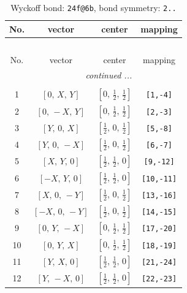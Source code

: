 \documentclass[fleqn,8pt]{jsarticle}
\begin{document}
\renewcommand{\arraystretch}{1.2}
\begin{longtable}{cccc}
\caption{Wyckoff bond: {\tt 24f@6b}, bond symmetry: {\tt 2..}}
 \\
 \hline \hline
No. & vector & center & mapping \\ \hline \endfirsthead

\multicolumn{3}{l}{\tablename\ \thetable{}} \\
 \hline \hline
No. & vector & center & mapping \\ \hline \endhead

 \hline \hline
\multicolumn{3}{r}{\footnotesize\it continued ...} \\ \endfoot

 \hline \hline
\multicolumn{3}{r}{} \\ \endlastfoot

1 & $\left[ 0,\, X,\, Y \right]$ & $\left[ 0,\, \frac{1}{2},\, \frac{1}{2} \right]$ & {\tt [1,-4]} \\ \hline
2 & $\left[ 0,\, - X,\, Y \right]$ & $\left[ 0,\, \frac{1}{2},\, \frac{1}{2} \right]$ & {\tt [2,-3]} \\ \hline
3 & $\left[ Y,\, 0,\, X \right]$ & $\left[ \frac{1}{2},\, 0,\, \frac{1}{2} \right]$ & {\tt [5,-8]} \\ \hline
4 & $\left[ Y,\, 0,\, - X \right]$ & $\left[ \frac{1}{2},\, 0,\, \frac{1}{2} \right]$ & {\tt [6,-7]} \\ \hline
5 & $\left[ X,\, Y,\, 0 \right]$ & $\left[ \frac{1}{2},\, \frac{1}{2},\, 0 \right]$ & {\tt [9,-12]} \\ \hline
6 & $\left[ - X,\, Y,\, 0 \right]$ & $\left[ \frac{1}{2},\, \frac{1}{2},\, 0 \right]$ & {\tt [10,-11]} \\ \hline
7 & $\left[ X,\, 0,\, - Y \right]$ & $\left[ \frac{1}{2},\, 0,\, \frac{1}{2} \right]$ & {\tt [13,-16]} \\ \hline
8 & $\left[ - X,\, 0,\, - Y \right]$ & $\left[ \frac{1}{2},\, 0,\, \frac{1}{2} \right]$ & {\tt [14,-15]} \\ \hline
9 & $\left[ 0,\, Y,\, - X \right]$ & $\left[ 0,\, \frac{1}{2},\, \frac{1}{2} \right]$ & {\tt [17,-20]} \\ \hline
10 & $\left[ 0,\, Y,\, X \right]$ & $\left[ 0,\, \frac{1}{2},\, \frac{1}{2} \right]$ & {\tt [18,-19]} \\ \hline
11 & $\left[ Y,\, X,\, 0 \right]$ & $\left[ \frac{1}{2},\, \frac{1}{2},\, 0 \right]$ & {\tt [21,-24]} \\ \hline
12 & $\left[ Y,\, - X,\, 0 \right]$ & $\left[ \frac{1}{2},\, \frac{1}{2},\, 0 \right]$ & {\tt [22,-23]} \\
\end{longtable}
\end{document}
